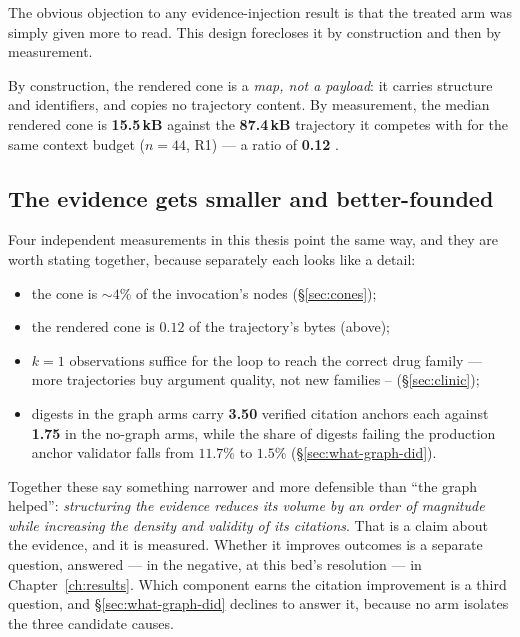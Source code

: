 The obvious objection to any evidence-injection result is that the treated
arm was simply given more to read. This design forecloses it by
construction and then by measurement.

By construction, the rendered cone is a \emph{map, not a payload}: it
carries structure and identifiers, and copies no trajectory content. By
measurement, the median rendered cone is \textbf{15.5\,kB} against the
\textbf{87.4\,kB} trajectory it competes with for the same context budget
($n{=}44$, R1) --- a ratio of \textbf{0.12} .

\subsection*{The evidence gets smaller and better-founded}

Four independent measurements in this thesis point the same way, and they
are worth stating together, because separately each looks like a detail:

\begin{itemize}
  \item the cone is $\sim$$4\%$ of the invocation's nodes
        (\S\ref{sec:cones});
  \item the rendered cone is $0.12$ of the trajectory's bytes (above);
  \item $k{=}1$ observations suffice for the loop to reach the correct drug
        family --- more trajectories buy argument quality, not new families
        -- (\S\ref{sec:clinic});
  \item digests in the graph arms carry \textbf{3.50} verified citation
        anchors each against \textbf{1.75} in the no-graph arms, while the
        share of digests failing the production anchor validator falls
        from $11.7\%$ to $1.5\%$  (\S\ref{sec:what-graph-did}).
\end{itemize}

Together these say something narrower and more defensible than ``the graph
helped'': \emph{structuring the evidence reduces its volume by an order of
magnitude while increasing the density and validity of its citations}. That
is a claim about the evidence, and it is measured. Whether it improves
outcomes is a separate question, answered --- in the negative, at this
bed's resolution --- in Chapter~\ref{ch:results}. Which component earns the
citation improvement is a third question, and \S\ref{sec:what-graph-did}
declines to answer it, because no arm isolates the three candidate causes.

